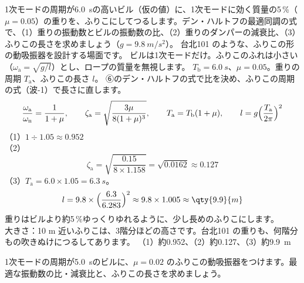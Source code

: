 \label{ph:波-3:ex9}
\begin{phreidai}[ふりこの動吸振器を最適に同調する]
1次モードの周期が\qty{6.0}{s}の高いビル（仮の値）に、1次モードに効く質量の5\,\%（$\mu=0.05$）の重りを、ふりこにしてつるします。デン・ハルトフの最適同調の式で、（1）重りの振動数とビルの振動数の比、（2）重りのダンパーの減衰比、（3）ふりこの長さを求めましょう（$g=\qty{9.8}{m/s^2}$）。
\phbamen
台北101 のような、ふりこの形の動吸振器を設計する場面です。
\phmushi
ビルは1次モードだけ。ふりこのふれは小さい（$\omega_{\mathrm a}=\sqrt{g/l}$）とし、ロープの質量を無視します。
\phzu
$T_{\mathrm b}=\qty{6.0}{s}$、$\mu=0.05$。重りの周期 $T_{\mathrm a}$、ふりこの長さ $l$。
\phriyu
⑥のデン・ハルトフの式で比を決め、ふりこの周期の式（波-1）で長さに直します。
\phtateru
\[\frac{\omega_{\mathrm a}}{\omega_{\mathrm n}}=\frac{1}{1+\mu},\qquad\zeta_{\mathrm a}=\sqrt{\frac{3\mu}{8(1+\mu)^3}},\qquad T_{\mathrm a}=T_{\mathrm b}(1+\mu),\qquad l=g\Bigl(\frac{T_{\mathrm a}}{2\pi}\Bigr)^2\]
\phtoku
（1）$1\div1.05\approx0.952$\\
（2）\[\zeta_{\mathrm a}=\sqrt{\frac{0.15}{8\times1.158}}=\sqrt{0.0162}\approx0.127\]
（3）$T_{\mathrm a}=6.0\times1.05=\qty{6.3}{s}$。\[l=9.8\times\Bigl(\frac{6.3}{6.283}\Bigr)^2\approx9.8\times1.005\approx\qty{9.9}{m}\]
\phtashikame
重りはビルより約5\,\%ゆっくりゆれるように、少し長めのふりこにします。\\
大きさ：10 m 近いふりこは、3階分ほどの高さです。台北101 の重りも、何階分もの吹きぬけにつるしてあります。
\kotae （1）約0.952、（2）約0.127、（3）約\qty{9.9}{m}
\end{phreidai}
\begin{jibun}
1次モードの周期が\qty{5.0}{s}のビルに、$\mu=0.02$ のふりこの動吸振器をつけます。最適な振動数の比・減衰比と、ふりこの長さを求めましょう。
\end{jibun}

